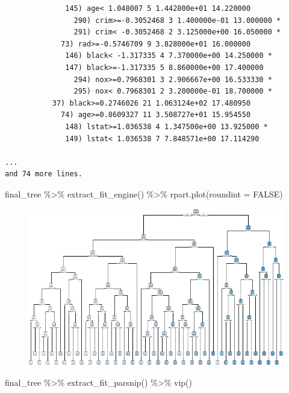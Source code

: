 \documentclass[
]{article}
\newenvironment{Shaded}{\begin{snugshade}}{\end{snugshade}}
\newcommand{\AttributeTok}[1]{\textcolor[rgb]{0.40,0.45,0.13}{#1}}
\newcommand{\ConstantTok}[1]{\textcolor[rgb]{0.56,0.35,0.01}{#1}}
\newcommand{\FunctionTok}[1]{\textcolor[rgb]{0.28,0.35,0.67}{#1}}
\newcommand{\NormalTok}[1]{\textcolor[rgb]{0.00,0.23,0.31}{#1}}
\newcommand{\SpecialCharTok}[1]{\textcolor[rgb]{0.37,0.37,0.37}{#1}}
\begin{document}
\begin{verbatim}
              145) age< 1.048007 5 1.442800e+01 14.220000  
                290) crim>=-0.3052468 3 1.400000e-01 13.000000 *
                291) crim< -0.3052468 2 3.125000e+00 16.050000 *
             73) rad>=-0.5746709 9 3.828000e+01 16.000000  
              146) black< -1.317335 4 7.370000e+00 14.250000 *
              147) black>=-1.317335 5 8.860000e+00 17.400000  
                294) nox>=0.7968301 3 2.906667e+00 16.533330 *
                295) nox< 0.7968301 2 3.200000e-01 18.700000 *
           37) black>=0.2746026 21 1.063124e+02 17.480950  
             74) age>=0.8609327 11 3.508727e+01 15.954550  
              148) lstat>=1.036538 4 1.347500e+00 13.925000 *
              149) lstat< 1.036538 7 7.848571e+00 17.114290  

...
and 74 more lines.
\end{verbatim}

\begin{Shaded}
\begin{Highlighting}[]
\NormalTok{final\_tree }\SpecialCharTok{\%\textgreater{}\%}
  \FunctionTok{extract\_fit\_engine}\NormalTok{() }\SpecialCharTok{\%\textgreater{}\%}
  \FunctionTok{rpart.plot}\NormalTok{(}\AttributeTok{roundint =} \ConstantTok{FALSE}\NormalTok{)}
\end{Highlighting}
\end{Shaded}

\begin{figure}[H]

{\centering \includegraphics{hw4_files/figure-pdf/unnamed-chunk-11-1.pdf}

}

\end{figure}

\begin{Shaded}
\begin{Highlighting}[]
\NormalTok{final\_tree }\SpecialCharTok{\%\textgreater{}\%} 
  \FunctionTok{extract\_fit\_parsnip}\NormalTok{() }\SpecialCharTok{\%\textgreater{}\%} 
  \FunctionTok{vip}\NormalTok{()}
\end{Highlighting}
\end{Shaded}
\end{document}

